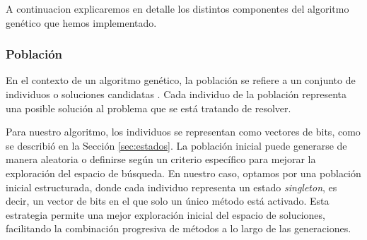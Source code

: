 







A continuacion explicaremos en detalle los distintos componentes del algoritmo genético que hemos implementado.

\subsubsection{Población}

En el contexto de un algoritmo genético, la población se refiere a un conjunto de individuos o soluciones candidatas \cite{Goldberg:1989}. 
Cada individuo de la población representa una posible solución al problema que se está tratando de resolver.

Para nuestro algoritmo, los individuos se representan como vectores de bits, como se describió en la Sección \ref{sec:estados}. 
La población inicial puede generarse de manera aleatoria o definirse según un criterio específico para mejorar la exploración del espacio de búsqueda. 
En nuestro caso, optamos por una población inicial estructurada, donde cada individuo representa un estado \emph{singleton}, es decir, 
un vector de bits en el que solo un único método está activado. Esta estrategia permite una mejor exploración inicial del espacio de soluciones, 
facilitando la combinación progresiva de métodos a lo largo de las generaciones.

